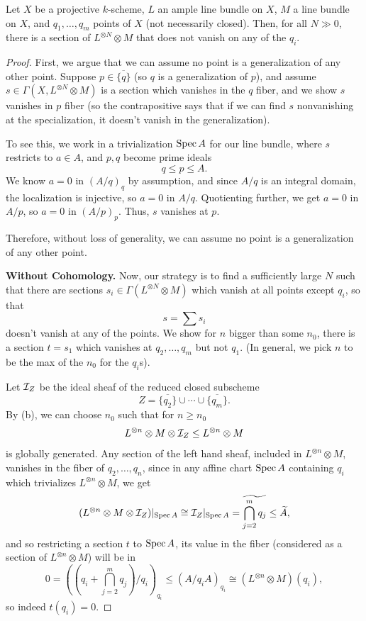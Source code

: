 \documentclass[12pt]{article}
\begin{document}
\begin{prop}
    Let $X$ be a projective $k$-scheme, $L$ an ample line bundle on $X$, $M$ a line bundle on $X$, and $q_1,\dots,q_m$ points of $X$ (not necessarily closed). Then, for all $N\gg 0$, there is a section of $L^{\otimes N}\otimes M$ that does not vanish on any of the $q_i$.
\end{prop}

\begin{proof}
    First, we argue that we can assume no point is a generalization of any other point. Suppose $p\in \overline{\{q\}}$ (so $q$ is a generalization of $p$), and assume $s\in \Gamma(X,L^{\otimes N}\otimes M)$ is a section which vanishes in the $q$ fiber, and we show $s$ vanishes in $p$ fiber (so the contrapositive says that if we can find $s$ nonvanishing at the specialization, it doesn't vanish in the generalization).

    To see this, we work in a trivialization $\operatorname{Spec} A$ for our line bundle, where $s$ restricts to $a\in A$, and $p,q$ become prime ideals
    \[q \leq p \leq A.\]
    We know $a=0$ in $(A/q)_q$ by assumption, and since $A/q$ is an integral domain, the localization is injective, so $a=0$ in $A/q$. Quotienting further, we get $a=0$ in $A/p$, so $a=0$ in $(A/p)_p$. Thus, $s$ vanishes at $p$.

    Therefore, without loss of generality, we can assume no point is a generalization of any other point.
    
    \textbf{Without Cohomology.} Now, our strategy is to find a sufficiently large $N$ such that there are sections $s_i\in \Gamma(L^{\otimes N}\otimes M)$ which vanish at all points except $q_i$, so that
    \[s = \sum s_i\]
    doesn't vanish at any of the points. We show for $n$ bigger than some $n_0$, there is a section $t=s_1$ which vanishes at $q_2,\dots,q_m$ but not $q_1$. (In general, we pick $n$ to be the max of the $n_0$ for the $q_i$s).
    
    Let $\mathcal{I}_Z$ be the ideal sheaf of the reduced closed subscheme
    \[Z=\overline{\{q_2\}}\cup\cdots\cup\overline{\{q_m\}}.\]
    By (b), we can choose $n_0$ such that for $n\geq n_0$
    \[L^{\otimes n} \otimes M \otimes \mathcal{I}_Z \leq L^{\otimes n} \otimes M\]
    is globally generated. Any section of the left hand sheaf, included in $L^{\otimes n} \otimes M$, vanishes in the fiber of $q_2,\dots,q_n$, since in any affine chart $\operatorname{Spec} A$ containing $q_i$ which trivializes $L^{\otimes n} \otimes M$, we get
    \[(L^{\otimes n} \otimes M \otimes \mathcal{I}_Z)|_{\operatorname{Spec} A} \cong \mathcal{I}_Z|_{\operatorname{Spec} A} = \widetilde{\bigcap_{j=2}^m q_j} \leq \widetilde{A},\]
    and so restricting a section $t$ to $\operatorname{Spec} A$, its value in the fiber (considered as a section of $L^{\otimes n}\otimes M$) will be in
    \[0=\left(\left(q_i + \bigcap_{j=2}^m q_j\right)/q_i \right)_{q_i} \leq (A/q_iA)_{q_i} \cong (L^{\otimes n} \otimes M)(q_i),\]
    so indeed $t(q_i)=0$.


\end{proof}
\end{document}
